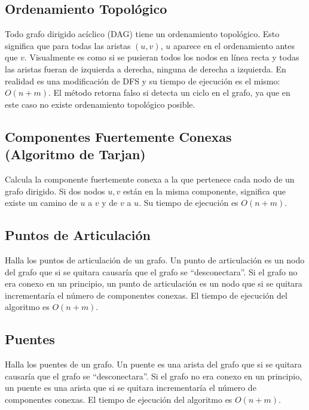 \documentclass{article}
\begin{document}
\begin{multicols}{2}
	\subsection{Ordenamiento Topológico}
	Todo grafo dirigido acíclico (DAG) tiene un ordenamiento topológico. Esto significa que para todas las aristas \((u,v)\), \(u\) aparece en el ordenamiento antes que \(v\). Visualmente es como si se pusieran todos los nodos en línea recta y todas las aristas fueran de izquierda a derecha, ninguna de derecha a izquierda. En realidad es una modificación de DFS y su tiempo de ejecución es el mismo: \( O(n + m) \). El método retorna falso si detecta un ciclo en el grafo, ya que en este caso no existe ordenamiento topológico posible.
	
	
	\subsection{Componentes Fuertemente Conexas (Algoritmo de Tarjan)}
	Calcula la componente fuertemente conexa a la que pertenece cada nodo de un grafo dirigido. Si dos nodos \( u,v \) están en la misma componente, significa que existe un camino de \( u \) a \( v \) y de \( v \) a \( u \). Su tiempo de ejecución es \( O(n + m) \).
	
	
	\subsection{Puntos de Articulación}
	Halla los puntos de articulación de un grafo. Un punto de articulación es un nodo del grafo que si se quitara causaría que el grafo se ``desconectara''. Si el grafo no era conexo en un principio, un punto de articulación es un nodo que si se quitara incrementaría el número de componentes conexas. El tiempo de ejecución del algoritmo es \( O(n + m) \).
	
	
	\subsection{Puentes}
	Halla los puentes de un grafo.  Un puente es una arista del grafo que si se quitara causaría que el grafo se ``desconectara''. Si el grafo no era conexo en un principio, un puente es una arista que si se quitara incrementaría el número de componentes conexas. El tiempo de ejecución del algoritmo es \( O(n + m) \).
	
	

\end{multicols}
\end{document}
